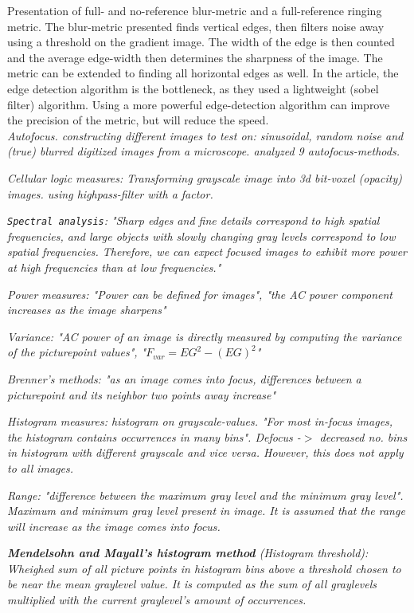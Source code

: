 Presentation of full- and no-reference blur-metric and a full-reference ringing metric. The blur-metric presented finds vertical edges, then filters noise away using a threshold on the gradient image. The width of the edge is then counted and the average edge-width then determines the sharpness of the image. The metric can be extended to finding all horizontal edges as well.\cite{jnbm07} In the article, the edge detection algorithm is the bottleneck, as they used a lightweight (sobel filter) algorithm. Using a more powerful edge-detection algorithm can improve the precision of the metric, but will reduce the speed.\\

\textit{Autofocus. constructing different images to test on: sinusoidal, random noise and (true) blurred digitized images from a microscope.\cite{jnbm08} analyzed 9 autofocus-methods.}

\textit{Cellular logic measures: Transforming grayscale image into 3d bit-voxel (opacity) images. using highpass-filter with a factor.}

\textit{\texttt{Spectral analysis}: "Sharp edges and fine details correspond to high spatial frequencies, and large
objects with slowly changing gray levels correspond to
low spatial frequencies. Therefore, we can expect focused images to exhibit more power at high frequencies
than at low frequencies."}

\textit{Power measures: "Power can be defined for images", "the AC power component increases as the image sharpens"}

\textit{    Variance: "AC power of an image is directly measured by computing the variance of the picturepoint values", "$F_{var} = E{G^2} - (E{G})^2$"}
    
\textit{    Brenner's methods: "as an image comes into focus, differences between a picturepoint and its neighbor two points away increase"}

\textit{Histogram measures: histogram on grayscale-values. "For most in-focus images, the histogram contains occurrences in many bins". Defocus -$>$ decreased no. bins in histogram with different grayscale and vice versa. However, this does not apply to all images.}

\textit{Range: "difference between the maximum gray level and the minimum gray level". Maximum and minimum gray level present in image. It is assumed that the range will increase as the image comes into focus.}

\textit{\textbf{Mendelsohn and Mayall’s histogram method} (Histogram threshold): Wheighed sum of all picture points in histogram bins above a threshold chosen to be near the mean graylevel value. It is computed as the sum of all graylevels multiplied with the current graylevel's amount of occurrences.}

